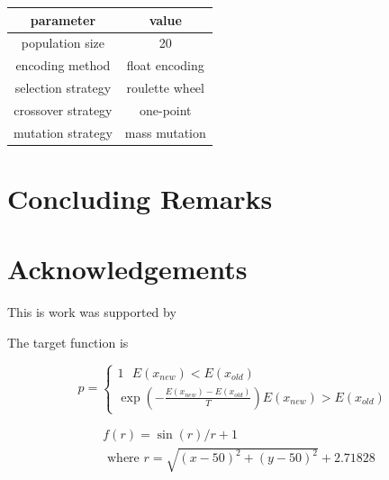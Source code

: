 \documentclass[smallextended]{svjour3}       %
\begin{document}
\begin{tabular}{cc}
	\toprule
	parameter & value \\
	\midrule
	population size      & 20               \\
    encoding method      & float encoding  \\
	selection strategy   & roulette wheel  \\
	crossover strategy   & one-point \\
	mutation strategy    & mass mutation   \\
	\bottomrule
\end{tabular}



\section{Concluding Remarks}
\section{Acknowledgements}
This is work was supported by 






The target function is 


\begin{equation}
p=\left\{
    \begin{array}{c}{1}  
        \text{      }   E\left(x_{n e w}\right)<E\left(x_{o l d}\right)
        \\ 
{\exp \left(-\frac{E\left(x_{new}\right)-E\left(x_{old}\right)}{T}\right)}
                        E\left(x_{n e w}\right)>E\left(x_{o l d}\right)
\end{array}\right.
\end{equation}


\begin{equation*}
    \begin{split}
        &f(r)=\sin(r)/r + 1  \\
             &\text{ where  } r=\sqrt{(x-50)^2+(y-50)^2}+2.71828
    \end{split}
\end{equation*}
\end{document}

